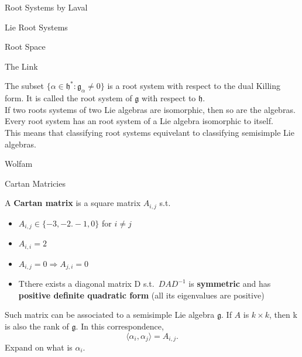 \documentclass[12pt, letterpaper]{article}
\begin{document}
\begin{section}{Root Systems by Laval}
\begin{subsection}{Lie Root Systems}
\begin{subsubsection}{Root Space}
    \end{subsubsection}

    \begin{subsubsection}{The Link}

      The subset \(\{\alpha \in \mathfrak{h}^{*} :
      \mathfrak{g}_{\alpha} \neq 0\}\) is a root system with respect to the dual
      Killing form. It is called the root system of \(\mathfrak{g}\) with
      respect to \(\mathfrak{h}\). \\
      If two roots systems of two Lie algebras are isomorphic, then so are the
      algebras. Every root system has an root system of a Lie algebra isomorphic
      to itself. \\
      This means that classifying root systems equivelant to classifying
      semisimple Lie algebras.

    \end{subsubsection}

  \end{subsection}

\end{section}

\begin{section}{Wolfam}

  \begin{subsection}{Cartan Matricies}

    A \textbf{Cartan matrix} is a square matrix \(A_{i,j}\) s.t.\
    \begin{itemize}
      \item \(A_{i,j} \in \{-3, -2. -1, 0\}\) for \(i \neq j\)
      \item \(A_{i,i} = 2\)
      \item \(A_{i,j} = 0 \Rightarrow A_{j,i} = 0\)
      \item Tthere exists a diagonal matrix D s.t.\ \(DAD^{-1}\) is
            \textbf{symmetric} and has \textbf{positive definite quadratic form}
            (all its eigenvalues are positive)
    \end{itemize}

    Such matrix can be associated to a semisimple Lie algebra \(\mathfrak{g}\).
    If \(A\) is \(k \times k\), then k is also the rank of \(\mathfrak{g}\). In
    this correspondence, \[\langle \alpha_{i}, \alpha_{j} \rangle = A_{i,j}.\]
    Expand on what is \(\alpha_{i}\).

  \end{subsection}

\end{section}
\end{document}
